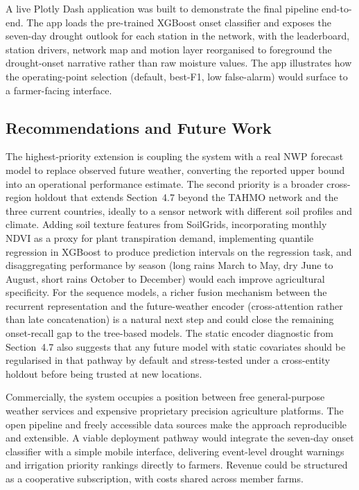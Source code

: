 \documentclass[12pt, a4paper]{article}
\begin{document}
A live Plotly Dash application was built to demonstrate the final pipeline
end-to-end. The app loads the pre-trained XGBoost onset classifier and exposes
the seven-day drought outlook for each station in the network, with the
leaderboard, station drivers, network map and motion layer reorganised to
foreground the drought-onset narrative rather than raw moisture values. The
app illustrates how the operating-point selection (default, best-F1, low
false-alarm) would surface to a farmer-facing interface.

\subsection{Recommendations and Future Work}

The highest-priority extension is coupling the system with a real NWP forecast
model to replace observed future weather, converting the reported upper bound
into an operational performance estimate. The second priority is a broader
cross-region holdout that extends Section~4.7 beyond the TAHMO network and the
three current countries, ideally to a sensor network with different soil
profiles and climate. Adding soil texture features from SoilGrids, incorporating
monthly NDVI as a proxy for plant transpiration demand, implementing quantile
regression in XGBoost to produce prediction intervals on the regression task,
and disaggregating performance by season (long rains March to May, dry June
to August, short rains October to December) would each improve agricultural
specificity. For the sequence models, a richer fusion mechanism between the
recurrent representation and the future-weather encoder (cross-attention
rather than late concatenation) is a natural next step and could close the
remaining onset-recall gap to the tree-based models. The static encoder
diagnostic from Section~4.7 also suggests that any future model with static
covariates should be regularised in that pathway by default and stress-tested
under a cross-entity holdout before being trusted at new locations.

Commercially, the system occupies a position between free general-purpose
weather services and expensive proprietary precision agriculture platforms.
The open pipeline and freely accessible data sources make the approach
reproducible and extensible. A viable deployment pathway would integrate the
seven-day onset classifier with a simple mobile interface, delivering
event-level drought warnings and irrigation priority rankings directly to
farmers. Revenue could be structured as a cooperative subscription, with costs
shared across member farms.
\end{document}
